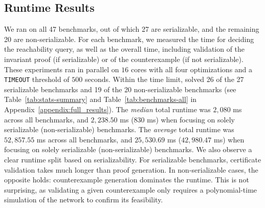 \subsection{Runtime Results}
We ran \toolname{} on all 47 benchmarks, out of which 27 are serializable, and the remaining 20 are non-serializable. 
For each benchmark, we measured the time for deciding the reachability query, as well as the overall time, including validation of the invariant proof (if serializable) or of the counterexample (if not serializable). These experiments ran in parallel on $16$ cores with all four optimizations and a \texttt{TIMEOUT} threshold of $500$ seconds.
%
Within the time limit, \toolname{} solved 26 of the 27 serializable benchmarks and 19 of the 20 non-serializable benchmarks (see Table~\ref{tab:stats-summary} and Table~\ref{tab:benchmarks-all} in Appendix~\ref{appendix:full_results}).
%
%
The \textit{median} total runtime was $2{,}080$ ms across all benchmarks, and $2{,}238.50$ ms ($830$ ms) when focusing on solely serializable (non-serializable) benchmarks.
%
The \textit{average} total runtime was $52{,}857.55$ ms across all benchmarks, and $25{,}530.69$ ms ($42{,}980.47$ ms) when focusing on solely serializable (non-serializable) benchmarks.
%
We also observe a clear runtime split based on serializability. For serializable benchmarks, certificate validation takes much longer than proof generation. In non-serializable cases, the opposite holds: counterexample generation dominates the runtime. This is not surprising, as validating a given counterexample only requires a polynomial-time simulation of the network to confirm its feasibility.
%
%


